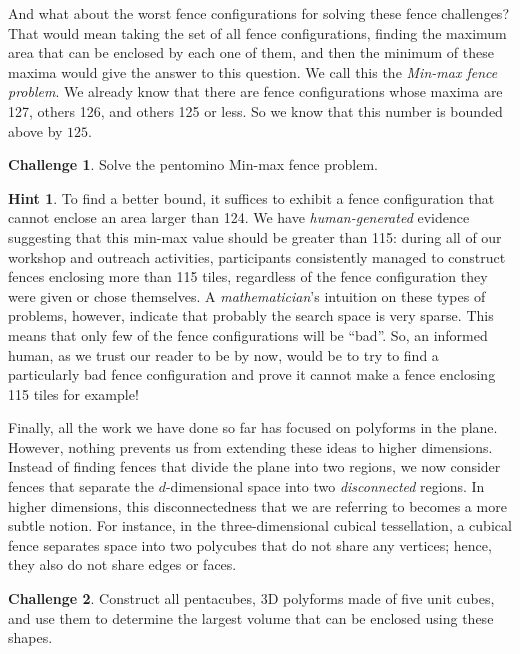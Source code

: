 \documentclass{amsart}
\theoremstyle{definition}
\newtheorem{hint}{Hint}
\newtheorem{challenge}{Challenge}
\theoremstyle{remark}
\begin{document}
	And what about the worst fence configurations for solving these fence challenges? That would mean taking the set of all fence configurations, finding the maximum area that can be enclosed by each one of them, and then the minimum of these maxima would give the answer to this question. We call this the \textit{Min-max fence problem}. We already know that there are fence configurations whose maxima are 127, others 126, and others 125 or less. So we know that this number is  bounded above by $125$.
	
	\begin{challenge}\label{challenge:minmax}
		Solve the pentomino Min-max fence problem.
	\end{challenge}
	
	\begin{hint}
		To find a better bound, it suffices to exhibit a fence configuration that cannot enclose an area larger than 124. We have \textit{human-generated} evidence suggesting that this min-max value should be greater than 115: during all of our workshop and outreach activities, participants consistently managed to construct fences enclosing more than 115 tiles, regardless of the fence configuration they were given or chose themselves. A \emph{mathematician}'s intuition on these types of problems, however, indicate that probably the search space is very sparse. This means that only few of the fence configurations will be ``bad''. So, an informed human, as we trust our reader to be by now, would be to try to find a particularly bad fence configuration and prove it cannot make a fence enclosing 115 tiles for example!
	\end{hint}
	
	
	Finally, all the work we have done so far has focused on polyforms in the plane. However, nothing prevents us from extending these ideas to higher dimensions. Instead of finding fences that divide the plane into two regions, we now consider fences that separate the $d$-dimensional space into two \emph{disconnected} regions. In higher dimensions, this disconnectedness that we are referring to becomes a more subtle notion. For instance, in the three-dimensional cubical tessellation, a cubical fence separates space into two polycubes that do not share any vertices; hence, they also do not share edges or faces.
	
	\begin{challenge}\label{challenge:pentocube}
		Construct all pentacubes, 3D polyforms made of five unit cubes, and use them to determine the largest volume that can be enclosed using these shapes.
	\end{challenge}
	
\end{document}
